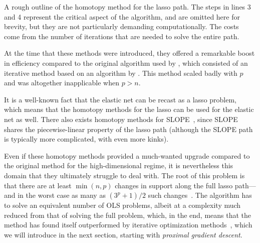 \begin{algorithm}
  \caption{A rough outline of the homotopy method for the lasso path. The steps in lines 3 and 4 represent the critical aspect of the algorithm, and are omitted here for brevity, but they are not particularly demanding computationally. The costs come from the number of iterations that are needed to solve the entire path.}
  \label{alg:homotopy}
\end{algorithm}

At the time that these methods were introduced, they offered a remarkable boost in efficiency compared to the original algorithm used by \textcite{tibshirani1996}, which consisted of an iterative method based on an algorithm by \textcite{lawson1995}. This method scaled badly with \(p\) and was altogether inapplicable when \(p > n\).

It is a well-known fact that the elastic net can be recast as a lasso problem, which means that the homotopy methods for the lasso can be used for the elastic net as well. There also exists homotopy methods for SLOPE~\parencite{nomura2020,dupuis2023}, since SLOPE shares the piecewise-linear property of the lasso path (although the SLOPE path is typically more complicated, with even more kinks).

Even if these homotopy methods provided a much-wanted upgrade compared to the original method for the high-dimensional regime, it is nevertheless this domain that they ultimately struggle to deal with. The root of this problem is that there are at least \(\min(n,p)\) changes in support along the full lasso path---and in the worst case as many as \((3^p + 1)/2\) such changes~\parencite{mairal2012}. The algorithm has to solve an equivalent number of OLS problems, albeit at a complexity much reduced from that of solving the full problem, which, in the end, means that the method has found itself outperformed by iterative optimization methods~\parencite{friedman2010}, which we will introduce in the next section, starting with \emph{proximal gradient descent}.


